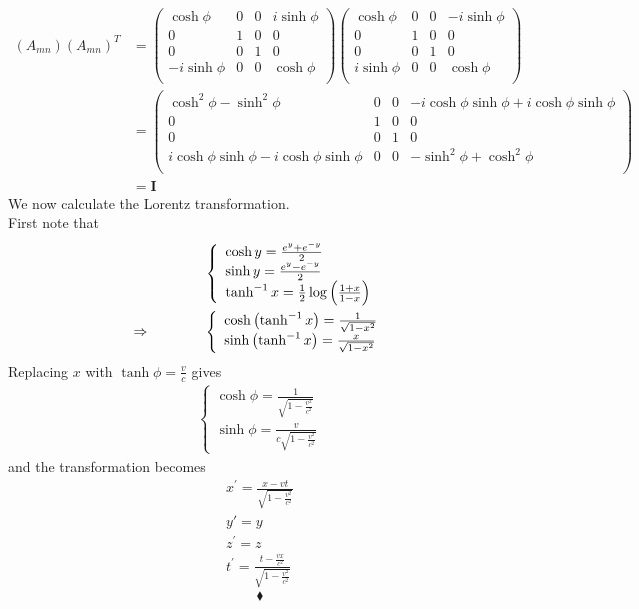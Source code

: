 \begin{align}
\left(A_{mn}\right)\left(A_{mn}\right)^{T}&=
\begin{pmatrix}
 \cosh \phi&  0& 0 & i \sinh \phi \\
 0& 1 & 0 &0  \\
 0& 0 &  1&  0\\
 -i\sinh \phi&  0& 0 &  \cosh \phi \\
\end{pmatrix}\begin{pmatrix}
 \cosh \phi&  0& 0 & -i \sinh \phi \\
 0& 1 & 0 &0  \\
 0& 0 &  1&  0\\
 i\sinh \phi&  0& 0 &  \cosh \phi \\
\end{pmatrix}\\
&= \begin{pmatrix}
 \cosh^2 \phi- \sinh ^2\phi &  0& 0 & -i \cosh \phi\sinh \phi +i \cosh \phi\sinh \phi  \\
 0& 1 & 0 &0  \\
 0& 0 &  1&  0\\
 i \cosh \phi\sinh \phi -i \cosh \phi\sinh \phi  &  0& 0 &  -\sinh^2 \phi + \cosh^2 \phi \\
\end{pmatrix}\\
&= \mathbf{I}
\end{align}
We now calculate the Lorentz transformation.\\
First note that 
\begin{align}
&\left \{\begin{array}{l}
\cosh y = \frac{e^y+e^{-y}}{2}\\
\sinh y = \frac{e^y-e^{-y}}{2}\\
\tanh^{-1}  x = \frac{1}{2} \log \left(\frac{1+x}{1-x}\right)\\
\end{array}\right.\\
\Rightarrow\quad\quad\quad\quad  &\left \{ \begin{array}{l}
\cosh\left(\tanh^{-1}  x \right) = \frac{1}{\sqrt{1-x^2}}\\
\sinh\left(\tanh^{-1}  x \right) = \frac{x}{\sqrt{1-x^2}}
\end{array}\right.
\end{align}
Replacing $x$ with $\tanh \phi = \frac{v}{c}$ gives
\begin{align}
\left \{ \begin{array}{l}
\cosh \phi = \frac{1}{\sqrt{1-\frac{v^2}{c^2}}}\\
\sinh \phi = \frac{v}{c\sqrt{1-\frac{v^2}{c^2}}}
\end{array}\right.
\end{align}
and the transformation becomes
$$\begin{array}{l}
x^{'} = \frac{x- vt}{\sqrt{1-\frac{v^2}{c^2}}}\\
y{'} = y\\
z^{'} = z\\
t^{'} = \frac{t-\frac{vx}{c^2}}{\sqrt{1-\frac{v^2}{c^2}}} 
\end{array}$$
$$\blacklozenge$$
\newpage



